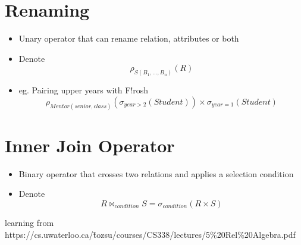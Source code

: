 \documentclass{article}
\begin{document}
\section{Renaming}
\begin{itemize}
    \item Unary operator that can rename relation, attributes or both
    \item Denote
        \begin{equation}
            \rho_{S(B_1,\dots,B_n)}(R)
        \end{equation}
    \item eg. Pairing upper years with F!rosh
        \begin{equation}
            \rho_{Mentor(senior, class)}(\sigma_{year>2}(Student))\times\sigma_{year = 1}(Student)
        \end{equation}
\end{itemize}
\section{Inner Join Operator}
\begin{itemize}
    \item Binary operator that crosses two relations and applies a selection condition
    \item Denote
        \begin{equation}
            R\bowtie_{condition}S = \sigma_{condition}(R\times S)
        \end{equation}
\end{itemize}
learning from https://cs.uwaterloo.ca/\~tozsu/courses/CS338/lectures/5\%20Rel\%20Algebra.pdf
\end{document}
